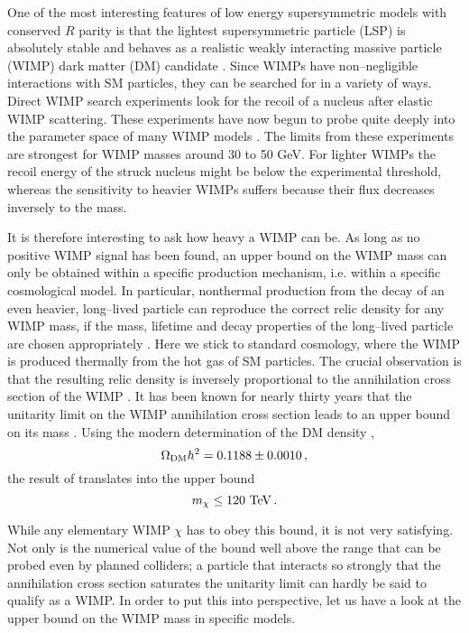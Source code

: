 \documentclass[a4paper,11pt]{article}
\begin{document}
One of the most interesting features of low energy supersymmetric
models with conserved $R$ parity is that the lightest supersymmetric
particle (LSP) is absolutely stable and behaves as a realistic weakly
interacting massive particle (WIMP) dark matter (DM) candidate
\cite{Ellis:1983ew, Jungman:1995df}. Since WIMPs have non--negligible
interactions with SM particles, they can be searched for in a variety
of ways. Direct WIMP search experiments look for the recoil of a
nucleus after elastic WIMP scattering. These experiments have now
begun to probe quite deeply into the parameter space of many WIMP
models \cite{pdg, Aprile:2018dbl}. The limits from these experiments
are strongest for WIMP masses around 30 to 50 GeV. For lighter WIMPs
the recoil energy of the struck nucleus might be below the
experimental threshold, whereas the sensitivity to heavier WIMPs
suffers because their flux decreases inversely to the mass.

It is therefore interesting to ask how heavy a WIMP can be. As long as
no positive WIMP signal has been found, an upper bound on the WIMP
mass can only be obtained within a specific production mechanism,
i.e. within a specific cosmological model. In particular, nonthermal
production from the decay of an even heavier, long--lived particle can
reproduce the correct relic density for any WIMP mass, if the mass,
lifetime and decay properties of the long--lived particle are chosen
appropriately \cite{Gelmini:2006pw}. Here we stick to standard
cosmology, where the WIMP is produced thermally from the hot gas of SM
particles. The crucial observation is that the resulting relic density
is inversely proportional to the annihilation cross section of the WIMP
\cite{kt}. It has been known for nearly thirty years that the unitarity
limit on the WIMP annihilation cross section leads to an upper bound on
its mass \cite{Griest:1989wd}. Using the modern determination of the
DM density \cite{Ade:2015xua},
%
\begin{equation} \label{relden}
\Omega_{\rm DM} h^2 = 0.1188\pm 0.0010\,,
\end{equation}
%
the result of \cite{Griest:1989wd} translates into the upper bound
%
\begin{equation} \label{unitarity}
m_\chi \leq 120 \ {\rm TeV}\,.
\end{equation}
%

While any elementary WIMP $\chi$ has to obey this bound, it is not
very satisfying. Not only is the numerical value of the bound well
above the range that can be probed even by planned colliders; a
particle that interacts so strongly that the annihilation cross
section saturates the unitarity limit can hardly be said to qualify as
a WIMP. In order to put this into perspective, let us have a look at
the upper bound on the WIMP mass in specific models.
\end{document}

